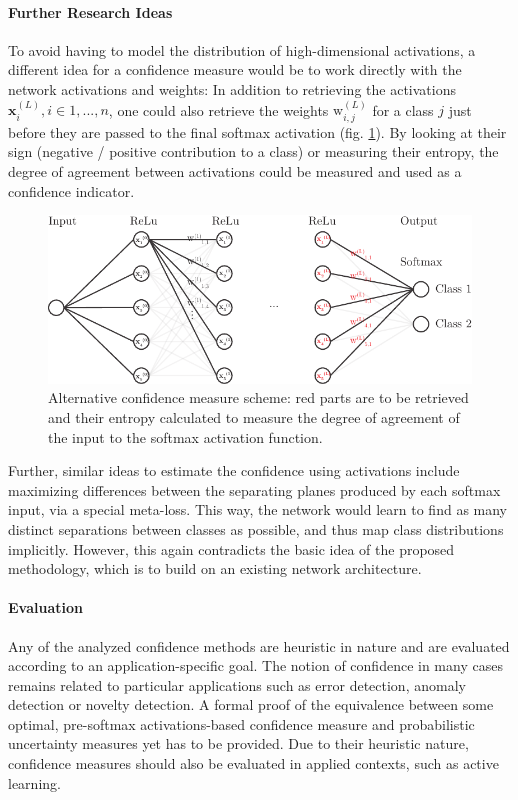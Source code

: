 \documentclass[10pt]{article}
\begin{document}
\paragraph{Further Research Ideas} To avoid having to model the distribution of high-dimensional activations, a different idea for a confidence measure would be to work directly with the network activations and weights: In addition to retrieving the activations $\mathbf{x}^{(L)}_i, i \in 1, ..., n$, one could also retrieve the weights $\text{w}^{(L)}_{i, j}$ for a class $j$ just before they are passed to the final softmax activation (fig. \ref{fig:nn_scheme}). By looking at their sign (negative / positive contribution to a class) or measuring their entropy, the degree of agreement between activations could be measured and used as a confidence indicator.
\begin{figure}[H]
	\centering
	\includegraphics[width=.7\textwidth]{Schema/nn_scheme}
	\caption{Alternative confidence measure scheme: red parts are to be retrieved and their entropy calculated to measure the degree of agreement of the input to the softmax activation function.}
	\label{fig:nn_scheme}
\end{figure}

Further, similar ideas to estimate the confidence using activations include maximizing differences between the separating planes produced by each softmax input, via a special meta-loss. This way, the network would learn to find as many distinct separations between classes as possible, and thus map class distributions implicitly. However, this again contradicts the basic idea of the proposed methodology, which is to build on an existing network architecture.

\paragraph{Evaluation} Any of the analyzed confidence methods are heuristic in nature and are evaluated according to an application-specific goal. The notion of confidence in many cases remains related to particular applications such as error detection, anomaly detection or novelty detection. A formal proof of the equivalence between some optimal, pre-softmax activations-based confidence measure and probabilistic uncertainty measures yet has to be provided. Due to their heuristic nature, confidence measures should also be evaluated in applied contexts, such as active learning.
\end{document}
